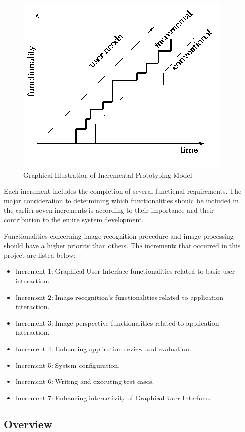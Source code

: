 \begin{figure}[htb]
\centering
\includegraphics[width=.5\textwidth]{section02/assets/IncrementalModel.png}
\caption[Graphical Illustration of Incremental Prototyping Model]{\label{IncrmentalModel}Graphical Illustration of Incremental Prototyping Model}
\end{figure}

\par Each increment includes the completion of several functional requirements. The major consideration to determining which functionalities should be included in the earlier seven increments is according to their importance and their contribution to the entire system development.
\par Functionalities concerning image recognition procedure  and image processing should have a higher priority than others. The increments that occurred in this project are listed below:
\begin{itemize}
\item Increment 1: Graphical User Interface functionalities related to basic user interaction.
\item Increment 2: Image recognition's functionalities related to application interaction.
\item Increment 3: Image perspective functionalities related to application interaction.
\item Increment 4: Enhancing application review and evaluation.
\item Increment 5: System configuration.
\item Increment 6: Writing and executing test cases.
\item Increment 7: Enhancing interactivity of Graphical User Interface.
\end{itemize}

\subsection{Overview} 
\label{RequirementsOverview}
